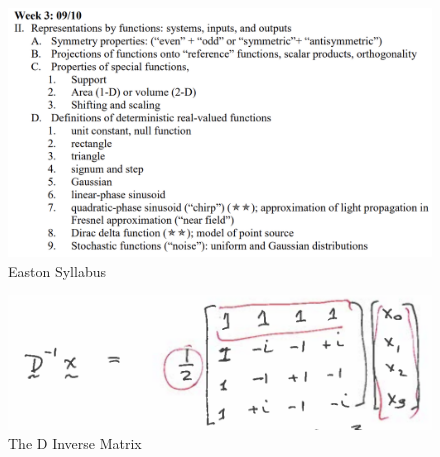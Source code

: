 \documentclass{article}
\begin{document}
\begin{figure}[h!]
\centering
\includegraphics[scale=.65]{Fourier/Week 3/Week3.1.png}
\caption{Easton Syllabus}
\label{fig:Snowman}
\end{figure}

\begin{figure}[h!]
\centering
\includegraphics[scale=.65]{Fourier/Week 3/Notes/DMatrix.png}
\caption{The D Inverse Matrix}
\label{fig:Notes3}
\end{figure}
\end{document}
